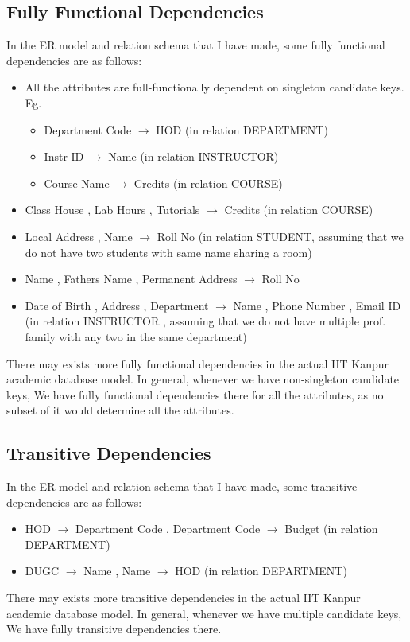 \documentclass[12pt]{article}%
\begin{document}
\subsection{Fully Functional Dependencies}
In the ER model and relation schema that I have made, some fully functional dependencies are as follows:
\begin{itemize}
\item All the attributes are full-functionally dependent on singleton candidate keys. Eg. 
\begin{itemize}
\item Department Code $\rightarrow$ HOD (in relation DEPARTMENT)
\item Instr ID $\rightarrow$ Name (in relation INSTRUCTOR)
\item Course Name $\rightarrow$ Credits (in relation COURSE)
\end{itemize}
\item Class House , Lab Hours , Tutorials $\rightarrow$ Credits (in relation COURSE)
\item Local Address , Name $\rightarrow$ Roll No (in relation STUDENT, assuming that we do not have two students with same name sharing a room)
\item Name , Fathers Name , Permanent Address $\rightarrow$ Roll No
\item Date of Birth , Address , Department $\rightarrow$ Name , Phone Number , Email ID (in relation INSTRUCTOR , assuming that we do not have multiple prof. family with any two in the same department)
\end{itemize}
There may exists more fully functional dependencies in the actual IIT Kanpur academic database model. 
In general, whenever we have non-singleton candidate keys, We have fully functional dependencies there for all the attributes, as no subset of it would determine all the attributes. 
\subsection{Transitive Dependencies}
In the ER model and relation schema that I have made, some transitive dependencies are as follows:
\begin{itemize}
\item HOD $\rightarrow$ Department Code , Department Code $\rightarrow$ Budget (in relation DEPARTMENT)
\item DUGC $\rightarrow$ Name , Name $\rightarrow$ HOD (in relation DEPARTMENT) 
\end{itemize}
There may exists more transitive dependencies in the actual IIT Kanpur academic database model.
In general, whenever we have multiple candidate keys, We have fully transitive dependencies there.
\end{document}
